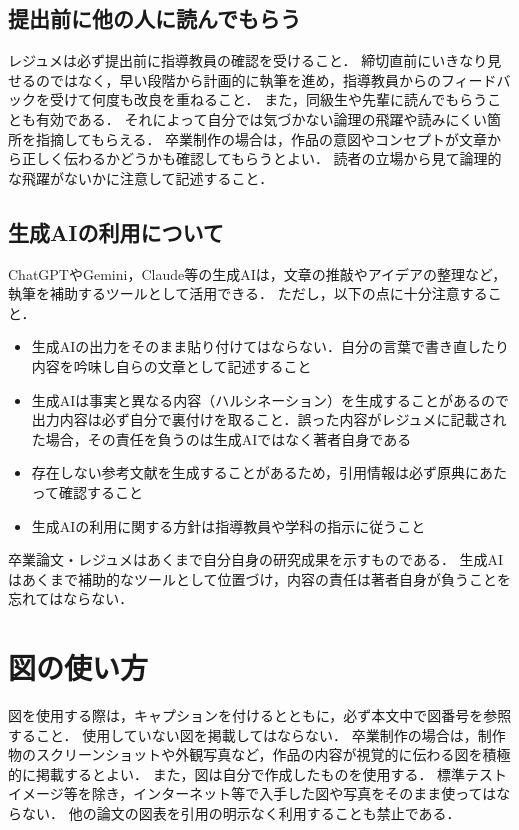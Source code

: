 \subsection{提出前に他の人に読んでもらう}
\label{subsec:review}
レジュメは必ず提出前に指導教員の確認を受けること．
締切直前にいきなり見せるのではなく，早い段階から計画的に執筆を進め，指導教員からのフィードバックを受けて何度も改良を重ねること．
また，同級生や先輩に読んでもらうことも有効である．
それによって自分では気づかない論理の飛躍や読みにくい箇所を指摘してもらえる．
卒業制作の場合は，作品の意図やコンセプトが文章から正しく伝わるかどうかも確認してもらうとよい．
読者の立場から見て論理的な飛躍がないかに注意して記述すること．

\subsection{生成AIの利用について}
\label{subsec:ai}
ChatGPTやGemini，Claude等の生成AIは，文章の推敲やアイデアの整理など，執筆を補助するツールとして活用できる．
ただし，以下の点に十分注意すること．
\begin{itemize}
    \item 生成AIの出力をそのまま貼り付けてはならない．自分の言葉で書き直したり内容を吟味し自らの文章として記述すること
    \item 生成AIは事実と異なる内容（ハルシネーション）を生成することがあるので出力内容は必ず自分で裏付けを取ること．誤った内容がレジュメに記載された場合，その責任を負うのは生成AIではなく著者自身である
    \item 存在しない参考文献を生成することがあるため，引用情報は必ず原典にあたって確認すること
    \item 生成AIの利用に関する方針は指導教員や学科の指示に従うこと
\end{itemize}
卒業論文・レジュメはあくまで自分自身の研究成果を示すものである．
生成AIはあくまで補助的なツールとして位置づけ，内容の責任は著者自身が負うことを忘れてはならない．

\section{図の使い方}
\label{sec:figure}

図を使用する際は，キャプションを付けるとともに，必ず本文中で図番号を参照すること．
使用していない図を掲載してはならない．
卒業制作の場合は，制作物のスクリーンショットや外観写真など，作品の内容が視覚的に伝わる図を積極的に掲載するとよい．
また，図は自分で作成したものを使用する．
標準テストイメージ等を除き，インターネット等で入手した図や写真をそのまま使ってはならない．
他の論文の図表を引用の明示なく利用することも禁止である．

